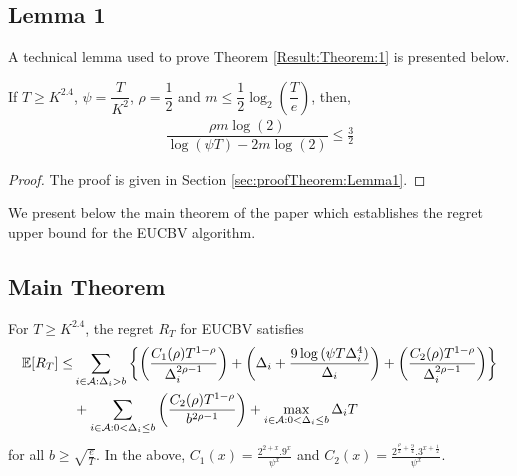 \subsection{Lemma 1}

A technical lemma used to prove Theorem \ref{Result:Theorem:1} is presented below.

\begin{lemma}
\label{results:Lemma:1}
If $T\geq K^{2.4}$, $\psi=\dfrac{T}{ K^2}$, $\rho=\dfrac{1}{2}$ and $m\leq \dfrac{1}{2} \log_2(\dfrac{T}{e}) $, then,
\begin{align*}
\dfrac{\rho m \log(2)}{\log(\psi T) - 2m\log( 2)} \leq \frac{3}{2}
\end{align*}
\end{lemma}

\begin{proof}
The proof is given in Section \ref{sec:proofTheorem:Lemma1}.
\end{proof}

We present below the main theorem of the paper which establishes the regret upper bound for the EUCBV  algorithm. 

\subsection{Main Theorem}
\begin{theorem}
\label{Result:Theorem:1}
For $T\geq K^{2.4}$, the regret $R_T$ for EUCBV satisfies
\begin{align*}
 \mathbb{E} [R_{T}] \leq &\sum\limits_{i\in \mathcal{A} :\Delta_{i} > b}\bigg\lbrace\bigg(\dfrac{C_{1}(\rho)T^{1-\rho}}{\Delta_{i}^{2\rho -1}}\bigg) + \bigg(\Delta_{i}+\dfrac{9\log{(\psi  T\Delta_{i}^{4})}}{\Delta_{i}}\bigg) + \bigg(\dfrac{ C_{2}(\rho) T^{1-\rho}}{\Delta_{i}^{2\rho-1}} \bigg)\bigg \rbrace \\ 
  & +\sum\limits_{i\in \mathcal{A} :0 < \Delta_{i}\leq b}\bigg(\dfrac{C_{2}(\rho)T^{1-\rho}}{b^{2\rho -1}} \bigg) + \max_{i\in \mathcal{A} :0 < \Delta_{i}\leq b}\Delta_{i}T
\end{align*}
for all $b\geq\sqrt{\frac{e}{T}}$. In the above, $C_1(x) = \frac{2^{2+x}.9^{x}}{\psi^{x}}$ and $C_2(x) = \frac{2^{\frac{\rho}{2}+\frac{9}{4}}.3^{x+\frac{1}{2}}}{\psi^{x}}$.
\end{theorem}

